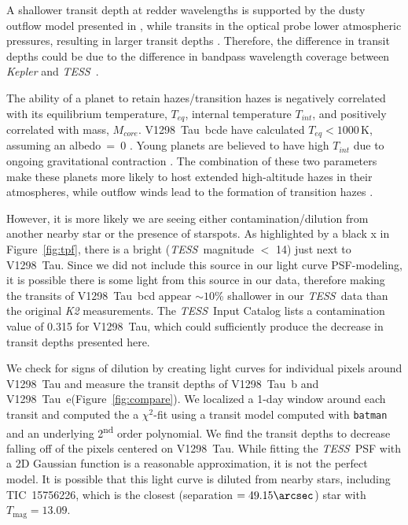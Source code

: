 \documentclass[twocolumn]{aastex631}
\newcommand{\tess}{\textit{TESS}}
\newcommand{\sname}{V1298~Tau\xspace}
\newcommand{\allplanets}{V1298~Tau~bcde\xspace}
\newcommand{\planetb}{V1298~Tau~b\xspace}
\newcommand{\planete}{V1298~Tau~e\xspace}
\newcommand{\planetknown}{V1298~Tau~bcd\xspace}
\begin{document}
A shallower transit depth at redder wavelengths is supported by the dusty outflow model presented in \cite{wang19}, while transits in the optical probe lower atmospheric pressures, resulting in larger transit depths \citep{gao20}. Therefore, the difference in transit depths could be due to the difference in bandpass wavelength coverage between \textit{Kepler} \citep[400-900~nm;][]{Howell2014} and \tess\ \citep[600-1000~nm;][]{Ricker2015}. 

The ability of a planet to retain hazes/transition hazes is negatively correlated with its equilibrium temperature, $T_{eq}$, internal temperature $T_{int}$, and positively correlated with mass, $M_{core}$. \allplanets have calculated $T_{eq} < 1000$\,K, assuming an albedo~=~0 \citep{David2019a}. Young planets are believed to have high $T_{int}$ due to ongoing gravitational contraction \citep{gu04}. The combination of these two parameters make these planets more likely to host extended high-altitude hazes in their atmospheres, while outflow winds lead to the formation of transition hazes \citep{gao20}. 

However, it is more likely we are seeing either contamination/dilution from another nearby star or the presence of starspots. As highlighted by a black x in Figure~\ref{fig:tpf}, there is a bright (\tess\ magnitude $<$ 14) just next to \sname. Since we did not include this source in our light curve PSF-modeling, it is possible there is some light from this source in our data, therefore making the transits of \planetknown appear $\sim 10$\% shallower in our \tess\ data than the original \textit{K2} measurements. The \tess\ Input Catalog \citep{stassun18} lists a contamination value of 0.315 for \sname, which could sufficiently produce the decrease in transit depths presented here. 

We check for signs of dilution by creating light curves for individual pixels around \sname and measure the transit depths of \planetb and \planete (Figure~\ref{fig:compare}). We localized a 1-day window around each transit and computed the a $\chi^2$-fit using a transit model computed with \texttt{batman} \citep{Kreidberg15} and an underlying 2\textsuperscript{nd} order polynomial. We find the transit depths to decrease falling off of the pixels centered on \sname. While fitting the \tess\ PSF with a 2D Gaussian function is a reasonable approximation, it is not the perfect model. It is possible that this light curve is diluted from nearby stars, including TIC~15756226, which is the closest (separation $= 49.15\arcsec$) star with $T_\textrm{mag} = 13.09$.
\end{document}
